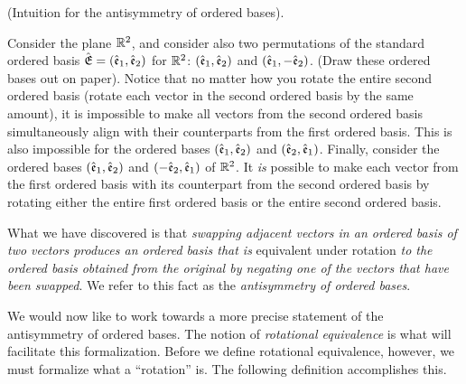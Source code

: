 \begin{deriv}
\label{ch::exterior_pwrs::deriv::ordered_bases_antisymmetry_intuition}
    (Intuition for the antisymmetry of ordered bases).
    
    Consider the plane $\mathbb{R}^2$, and consider also two permutations of the standard ordered basis ${\hat{\mathfrak{E}}} = (\hat{\mathfrak{e}}_1, \hat{\mathfrak{e}}_2)$ for $\mathbb{R}^2$: $(\hat{\mathfrak{e}}_1, \hat{\mathfrak{e}}_2)$ and $(\hat{\mathfrak{e}}_1, -\hat{\mathfrak{e}}_2)$. (Draw these ordered bases out on paper). Notice that no matter how you rotate the entire second ordered basis (rotate each vector in the second ordered basis by the same amount), it is impossible to make all vectors from the second ordered basis simultaneously align with their counterparts from the first ordered basis. This is also impossible for the ordered bases $(\hat{\mathfrak{e}}_1, \hat{\mathfrak{e}}_2)$ and $(\hat{\mathfrak{e}}_2, \hat{\mathfrak{e}}_1)$. Finally, consider the ordered bases $(\hat{\mathfrak{e}}_1, \hat{\mathfrak{e}}_2)$ and $(-\hat{\mathfrak{e}}_2, \hat{\mathfrak{e}}_1)$ of $\mathbb{R}^2$. It \textit{is} possible to make each vector from the first ordered basis with its counterpart from the second ordered basis by rotating either the entire first ordered basis or the entire second ordered basis.
    
    What we have discovered is that \textit{swapping adjacent vectors in an ordered basis of two vectors produces an ordered basis that is} equivalent under rotation \textit{to the ordered basis obtained from the original by negating one of the vectors that have been swapped}. We refer to this fact as the \textit{antisymmetry of ordered bases}.
\end{deriv}

We would now like to work towards a more precise statement of the antisymmetry of ordered bases. The notion of \textit{rotational equivalence} is what will facilitate this formalization. Before we define rotational equivalence, however, we must formalize what a ``rotation'' is. The following definition accomplishes this.

